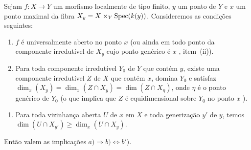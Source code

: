 \begin{proposition}[14.3.13]
\label{IV.14.3.13}
Sejam $f:X\to Y$ um morfismo localmente de tipo finito, $y$ um ponto de $Y$ e $x$ um ponto maximal da fibra $X_y=X\times_Y\operatorname{Spec}(k(y))$.
Consideremos as condições seguintes:
\begin{enumerate}[label=\emph{\alph*)}]
  \item $f$ é universalmente aberto no ponto $x$ (ou ainda em todo ponto da componente irredutível de $X_y$ cujo ponto genérico é $x$ , item~(ii)).
  \item Para toda componente irredutível $Y_0$ de $Y$ que contém $y$, existe uma componente irredutível $Z$ de $X$ que contém $x$, domina $Y_0$ e satisfaz
  $\dim_x(X_y)=\dim_x(Z\cap X_y)=\dim(Z\cap X_\eta)$,
  onde $\eta$ é o ponto genérico de $Y_0$ (o que implica que $Z$ é equidimensional sobre $Y_0$ no ponto $x$ ).
\end{enumerate}


\begin{enumerate}[label=\emph{\alph*$'$)}]
  \item[b$'$)] Para toda vizinhança aberta $U$ de $x$ em $X$ e toda generização $y'$ de $y$, temos $\dim(U\cap X_{y'})\geq\dim_x(U\cap X_y)$.
\end{enumerate}
Então valem as implicações $a)\Rightarrow b)\Leftrightarrow b')$.
\end{proposition}

